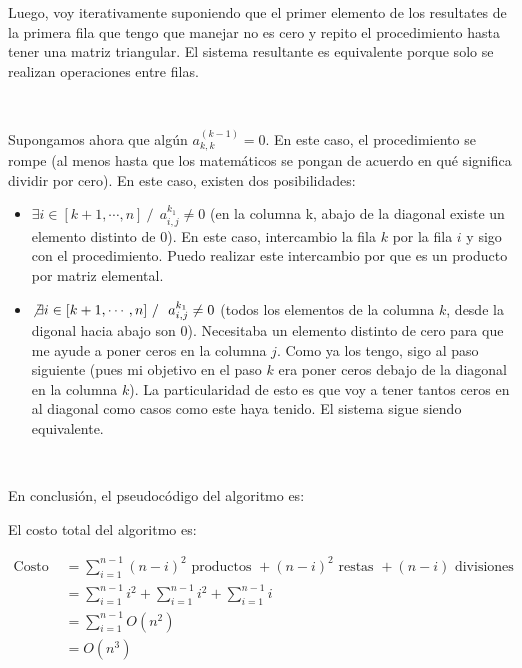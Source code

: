 \documentclass[]{article}
\begin{document}
Luego, voy iterativamente suponiendo que el primer elemento de los resultates de la primera fila que tengo que manejar no es cero y repito el procedimiento hasta tener una matriz triangular. El sistema resultante es equivalente porque solo se realizan operaciones entre filas.

~\newline

Supongamos ahora que algún $a^{(k-1)}_{k,k} = 0$. En este caso, el procedimiento se rompe (al menos hasta que los matemáticos se pongan de acuerdo en qué significa dividir por cero). En este caso, existen dos posibilidades:
\begin{itemize}
	\item $\exists i \in [k+1,\cdots,n]\ /\ \ a^{k_1}_{i,j}\neq0$ (en la columna k, abajo de la diagonal existe un elemento distinto de 0). En este caso, intercambio la fila $k$ por la fila $i$ y sigo con el procedimiento. Puedo realizar este intercambio por que es un producto por matriz elemental.

	\item $\not\exists i \in [k+1,\cdots,n]\ /\ \ a^{k_1}_{i,j}\neq0$ (todos los elementos de la columna $k$, desde la digonal hacia abajo son 0). Necesitaba un elemento distinto de cero para que me ayude a poner ceros en la columna $j$. Como ya los tengo, sigo al paso siguiente (pues mi objetivo en el paso $k$ era poner ceros debajo de la diagonal en la columna $k$). La particularidad de esto es que voy a tener tantos ceros en al diagonal como casos como este haya tenido. El sistema sigue siendo equivalente.
\end{itemize}


~\newline

En conclusión, el pseudocódigo del algoritmo es:


El costo total del algoritmo es:
\begin{center}

\begin{align*}
	\displaystyle\text{Costo }&=  \sum_{i=1}^{n-1}(n-i)^2\text{ productos } + (n-i)^2\text{ restas } + (n-i)\text{ divisiones }\\
	&= \displaystyle\sum_{i=1}^{n-1}i^2 + \sum_{i=1}^{n-1}i^2 + \sum_{i=1}^{n-1}i\\
	&= \displaystyle\sum_{i=1}^{n-1}O(n^2)\\
	&= O(n^3)
\end{align*}
\end{center}
\end{document}
